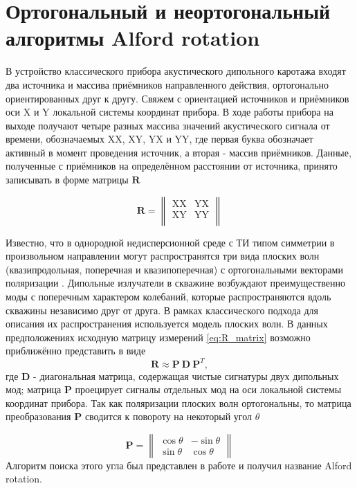 \documentclass[a4paper,11pt]{article}
\begin{document}
\section{Ортогональный и неортогональный алгоритмы Alford rotation}
В устройство классического прибора акустического дипольного каротажа входят два источника и массива приёмников направленного действия, ортогонально ориентированных друг к другу. Свяжем с ориентацией источников и приёмников оси X и Y локальной системы координат прибора. В ходе работы прибора на выходе получают четыре разных массива значений акустического сигнала от времени, обозначаемых XX, XY, YX и YY, где первая буква обозначает активный в момент проведения источник, а вторая - массив приёмников. Данные, полученные с приёмников на определённом расстоянии от источника, принято записывать в форме матрицы $\mathbf{R}$ 

\begin{equation}
	\mathbf{R} = \left\|
	\begin{array}{cc}
	\text{XX} & \text{YX} \\
	\text{XY} & \text{YY} \\
	\end{array}
	\right\| 
	\label{eq:R_matrix}
\end{equation}

Известно, что в однородной недисперсионной среде с ТИ типом симметрии в произвольном направлении могут распространятся три вида плоских волн (квазипродольная, поперечная и квазипоперечная) с ортогональными векторами поляризации%
. Дипольные излучатели в скважине возбуждают преимущественно моды с поперечным характером колебаний, которые распространяются вдоль скважины независимо друг от друга. В рамках классического подхода для описания их распространения используется модель плоских волн.  В данных предположениях исходную матрицу измерений \eqref{eq:R_matrix} возможно приближённо представить в виде \cite{Dellinger1998}
\begin{equation}
	\mathbf{R} \approx \mathbf{P} \ \mathbf{D} \ \mathbf{P}^T, \label{eq:alford_symmetric} 
\end{equation}
где $\mathbf{D}$ - диагональная матрица, содержащая чистые сигнатуры двух дипольных мод; матрица $\mathbf{P}$ проецирует сигналы отдельных мод на оси локальной системы координат прибора. Так как поляризации плоских волн ортогональны, то матрица преобразования $\mathbf{P}$ сводится к повороту на некоторый угол $\theta$

\begin{equation*}
	\mathbf{P} = \left\|
	\begin{array}{cc}
	\cos \theta &-\sin \theta \\ 
	\sin \theta & \cos \theta
	\end{array} 
	\right\| 
\end{equation*}
Алгоритм поиска этого угла был представлен в работе \cite{Alford1986} и получил название Alford rotation.
\end{document}
